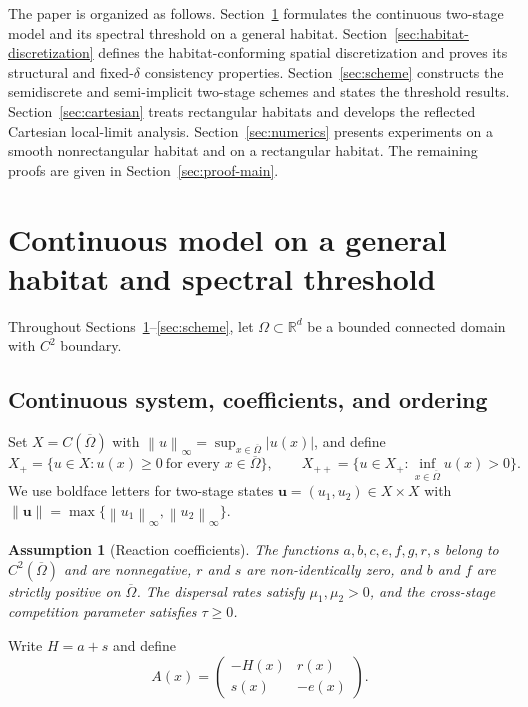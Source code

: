 \documentclass[11pt]{article}
\newtheorem{assumption}[theorem]{Assumption}
\theoremstyle{definition}
\newcommand{\R}{\mathbb{R}}
\newcommand{\norm}[1]{\left\lVert #1\right\rVert}
\newcommand{\uvec}{\bm u}
\begin{document}
The paper is organized as follows.  Section~\ref{sec:framework} formulates the continuous two-stage model and its spectral threshold on a general habitat.  Section~\ref{sec:habitat-discretization} defines the habitat-conforming spatial discretization and proves its structural and fixed-$\delta$ consistency properties.  Section~\ref{sec:scheme} constructs the semidiscrete and semi-implicit two-stage schemes and states the threshold results.  Section~\ref{sec:cartesian} treats rectangular habitats and develops the reflected Cartesian local-limit analysis.  Section~\ref{sec:numerics} presents experiments on a smooth nonrectangular habitat and on a rectangular habitat.  The remaining proofs are given in Section~\ref{sec:proof-main}.

\section{Continuous model on a general habitat and spectral threshold}
\label{sec:framework}

Throughout Sections~\ref{sec:framework}--\ref{sec:scheme}, let $\Omega\subset\R^d$ be a bounded connected domain with $C^2$ boundary.

\subsection{Continuous system, coefficients, and ordering}

Set $X=C(\overline\Omega)$ with $\norm{u}_\infty=\sup_{x\in\overline\Omega}|u(x)|$, and define
\[
 X_+=\{u\in X:u(x)\ge0\ \text{for every }x\in\overline\Omega\},
 \qquad
 X_{++}=\{u\in X_+:\inf_{x\in\overline\Omega}u(x)>0\}.
\]
We use boldface letters for two-stage states $\uvec=(u_1,u_2)\in X\times X$ with
$\norm{\uvec}=\max\{\norm{u_1}_\infty,\norm{u_2}_\infty\}$.

\begin{assumption}[Reaction coefficients]
\label{ass:coeff}
The functions $a,b,c,e,f,g,r,s$ belong to $C^2(\overline\Omega)$ and are nonnegative, $r$ and $s$ are non-identically zero, and $b$ and $f$ are strictly positive on $\overline\Omega$.  The dispersal rates satisfy $\mu_1,\mu_2>0$, and the cross-stage competition parameter satisfies $\tau\ge0$.
\end{assumption}
Write $H=a+s$ and define
\begin{equation}
\label{eq:A-matrix}
 A(x)=
 \begin{pmatrix}
 -H(x)&r(x)\\ s(x)&-e(x)
 \end{pmatrix}.
\end{equation}
\end{document}
